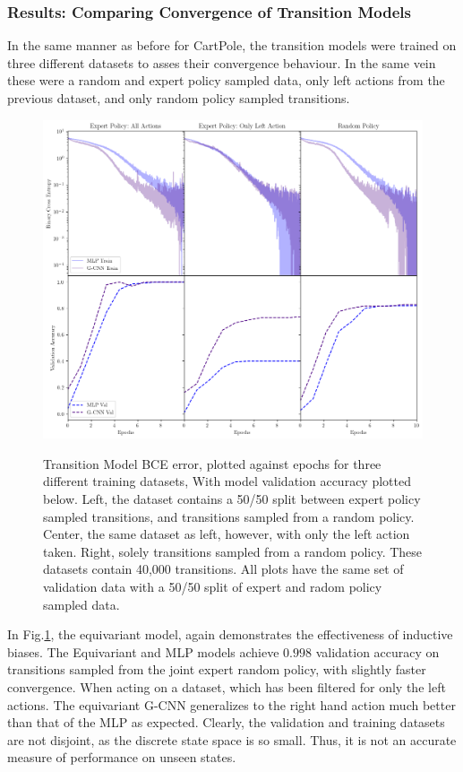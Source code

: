 \subsubsection{Results: Comparing Convergence of Transition Models}
In the same manner as before for CartPole, the transition models were trained on three different datasets to asses their convergence behaviour. In the same vein these were a random and expert policy sampled data, only left actions from the previous dataset, and only random policy sampled transitions.
\begin{figure}\label{fig:transition_model_catch}
	\centering
	\includegraphics[width=\linewidth]{Figures/transition_model_catch.png}
	\label{fig:transition_model_catch}
	\caption{Transition Model BCE error, plotted against epochs for three different training datasets, With model validation accuracy plotted below. Left, the dataset contains a 50/50 split between expert policy sampled transitions, and transitions sampled from a random policy. Center, the same dataset as left, however, with only the left action taken. Right, solely transitions sampled from a random policy. These datasets contain 40,000 transitions. All plots have the same set of validation data with a 50/50 split of expert and radom policy sampled data.}
\end{figure}
In Fig.\ref{fig:transition_model_catch}, the equivariant model, again demonstrates the effectiveness of inductive biases. The Equivariant and MLP models achieve $0.998$ validation accuracy on transitions sampled from the joint expert random policy, with slightly faster convergence. When acting on a dataset, which has been filtered for only the left actions. The equivariant G-CNN generalizes to the right hand action much better than that of the MLP as expected. Clearly, the validation and training datasets are not disjoint, as the discrete state space is so small. Thus, it is not an accurate measure of performance on unseen states.

